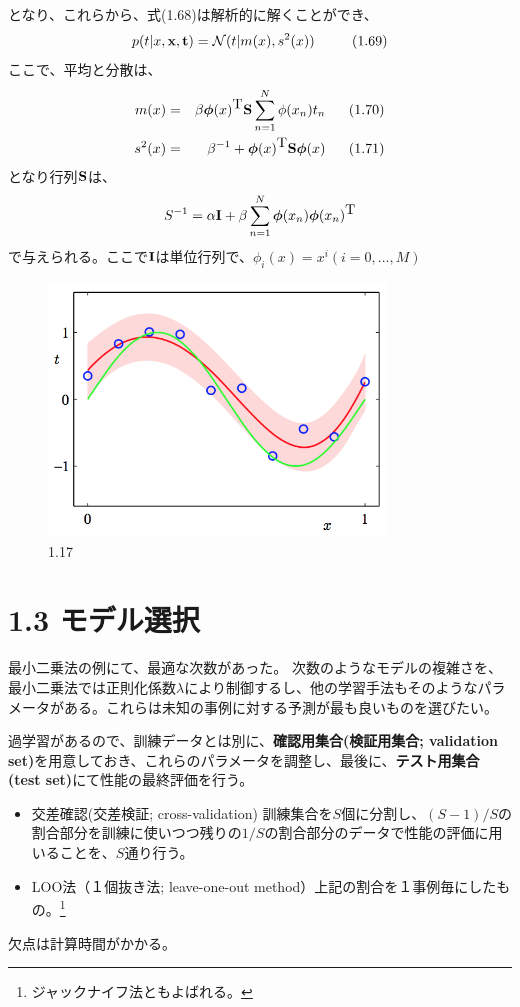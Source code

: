 \documentclass{jsarticle}
\def\N{{\mathcal{N}}}
\def\p{{\bm{\phi}}}
\def\t{{\mbox{\bf t}}}
\def\x{{\mbox{\bf x}}}
\def\T{{\mbox{T}}}
\def\S{{\mbox{\bf S}}}
\def\I{{\mbox{\bf I}}}
\begin{document}
となり、これらから、式(1.68)は解析的に解くことができ、
\[
p(t|x,\x,\t) = \N(t|m(x),s^2(x))  \ \ \ \ \ \ \ \ (1.69)
\]
ここで、平均と分散は、
\begin{eqnarray*}
  m(x) & = &\beta\p(x)^{\T}\S\sum_{n=1}^{N}\phi(x_n)t_n \ \ \ \ \ (1.70) \\
  s^2(x) & = & \beta^{-1} + \p(x)^{\T}\S\p(x) \ \ \ \ \ (1.71)
\end{eqnarray*}
となり行列$\S$は、
\begin{eqnarray*}
  S^{-1} = \alpha\I+\beta\sum_{n=1}^{N}\p(x_n)\p(x_n)^\T
\end{eqnarray*}
で与えられる。ここで$\I$は単位行列で、$\phi_i(x) = x^i (i=0,...,M)$

\begin{figure}
  \centering
  \includegraphics[width=0.8\textwidth]{f1-17.png}
  \caption{1.17}
\end{figure}

\section{1.3 モデル選択}

最小二乗法の例にて、最適な次数があった。
次数のようなモデルの複雑さを、最小二乗法では正則化係数$\lambda$により制御するし、他の学習手法もそのようなパラメータがある。これらは未知の事例に対する予測が最も良いものを選びたい。

過学習があるので、訓練データとは別に、{\bf 確認用集合(検証用集合; validation set)}を用意しておき、これらのパラメータを調整し、最後に、{\bf テスト用集合(test set)}にて性能の最終評価を行う。

\begin{itemize}
\item 交差確認(交差検証; cross-validation) 訓練集合を$S$個に分割し、$(S-1)/S$の割合部分を訓練に使いつつ残りの$1/S$の割合部分のデータで性能の評価に用いることを、$S$通り行う。
\item LOO法（１個抜き法; leave-one-out method）上記の割合を１事例毎にしたもの。\footnote{ジャックナイフ法ともよばれる。}
\end{itemize}
欠点は計算時間がかかる。
\end{document}
